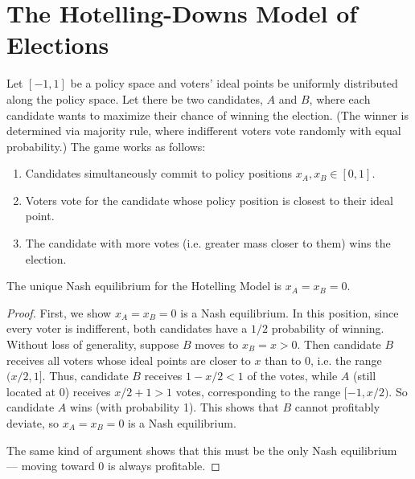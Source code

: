 \documentclass[../../../main.tex]{subfiles}
\begin{document}

\section{The Hotelling-Downs Model of Elections}

\nocite{hotelling1929stability}
\nocite{downs1957economic}

\begin{definition}
    Let $[-1,1]$ be a policy space and voters' ideal points be uniformly distributed along the policy space. 
    Let there be two candidates, $A$ and $B$, where each candidate wants to maximize their chance of winning the election. 
    (The winner is determined via majority rule, where indifferent voters vote randomly with equal probability.)
    The game works as follows:
    \begin{enumerate}
        \item Candidates simultaneously commit to policy positions $x_A,x_B\in[0,1]$.
        \item Voters vote for the candidate whose policy position is closest to their ideal point.
        \item The candidate with more votes (i.e. greater mass closer to them) wins the election.
    \end{enumerate}
\end{definition}

\begin{theorem}
    The unique Nash equilibrium for the Hotelling Model is $x_A=x_B=0$.
    \begin{proof}
        First, we show $x_A=x_B=0$ is a Nash equilibrium. 
        In this position, since every voter is indifferent, both candidates have a $1/2$ probability of winning.
        Without loss of generality, suppose $B$ moves to $x_B=x>0$.
        Then candidate $B$ receives all voters whose ideal points are closer to $x$ than to $0$, i.e. the range $(x/2,1]$. 
        Thus, candidate $B$ receives $1-x/2<1$ of the votes, while $A$ (still located at $0$) receives $x/2+1>1$ votes, corresponding to the range $[-1,x/2)$.
        So candidate $A$ wins (with probability 1). This shows that $B$ cannot profitably deviate, so $x_A=x_B=0$ is a Nash equilibrium.

        The same kind of argument shows that this must be the only Nash equilibrium --- moving toward 0 is always profitable.
    \end{proof}
\end{theorem}
\end{document}
